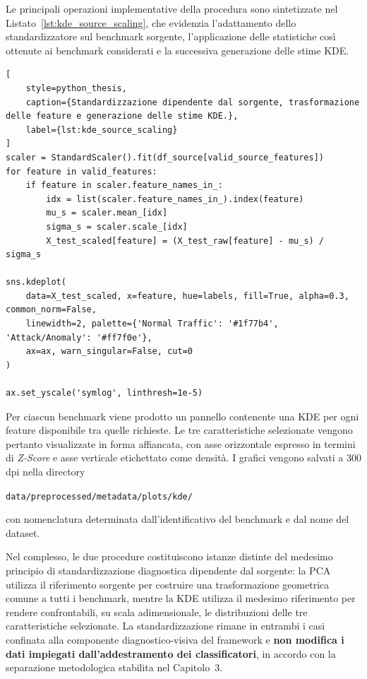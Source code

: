 Le principali operazioni implementative della procedura sono sintetizzate nel Listato~\ref{lst:kde_source_scaling}, che evidenzia l'adattamento dello standardizzatore sul benchmark sorgente, l'applicazione delle statistiche così ottenute ai benchmark considerati e la successiva generazione delle stime KDE.

\begin{lstlisting}[
    style=python_thesis,
    caption={Standardizzazione dipendente dal sorgente, trasformazione delle feature e generazione delle stime KDE.},
    label={lst:kde_source_scaling}
]
scaler = StandardScaler().fit(df_source[valid_source_features])
for feature in valid_features:
    if feature in scaler.feature_names_in_:
        idx = list(scaler.feature_names_in_).index(feature)
        mu_s = scaler.mean_[idx]
        sigma_s = scaler.scale_[idx]
        X_test_scaled[feature] = (X_test_raw[feature] - mu_s) / sigma_s

sns.kdeplot(
    data=X_test_scaled, x=feature, hue=labels, fill=True, alpha=0.3, common_norm=False,
    linewidth=2, palette={'Normal Traffic': '#1f77b4', 'Attack/Anomaly': '#ff7f0e'},
    ax=ax, warn_singular=False, cut=0
)

ax.set_yscale('symlog', linthresh=1e-5)
\end{lstlisting}

Per ciascun benchmark viene prodotto un pannello contenente una KDE per ogni feature disponibile tra quelle richieste. 
Le tre caratteristiche selezionate vengono pertanto visualizzate in forma affiancata, con asse orizzontale espresso in termini di \textit{Z-Score} e asse verticale etichettato come densità. 
I grafici vengono salvati a $300$ dpi nella directory 
\begin{center}
    \texttt{data/preprocessed/metadata/plots/kde/}
\end{center}
con nomenclatura determinata dall'identificativo del benchmark e dal nome del dataset.

Nel complesso, le due procedure costituiscono istanze distinte del medesimo principio di standardizzazione diagnostica dipendente dal sorgente: la PCA utilizza il riferimento sorgente per costruire una trasformazione geometrica comune a tutti i benchmark, mentre la KDE utilizza il medesimo riferimento per rendere confrontabili, su scala adimensionale, le distribuzioni delle tre caratteristiche selezionate. 
La standardizzazione rimane in entrambi i casi confinata alla componente diagnostico-visiva del framework e \textbf{non modifica i dati impiegati dall'addestramento dei classificatori}, in accordo con la separazione metodologica stabilita nel Capitolo~3.

